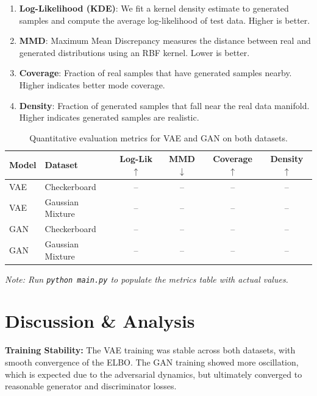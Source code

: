\documentclass[11pt]{article}
\begin{document}
\begin{enumerate}
    \item \textbf{Log-Likelihood (KDE)}: We fit a kernel density estimate to generated samples and compute the average log-likelihood of test data. Higher is better.
    \item \textbf{MMD}: Maximum Mean Discrepancy measures the distance between real and generated distributions using an RBF kernel. Lower is better.
    \item \textbf{Coverage}: Fraction of real samples that have generated samples nearby. Higher indicates better mode coverage.
    \item \textbf{Density}: Fraction of generated samples that fall near the real data manifold. Higher indicates generated samples are realistic.
\end{enumerate}

\begin{table}[H]
\centering
\caption{Quantitative evaluation metrics for VAE and GAN on both datasets.}
\label{tab:results}
\begin{tabular}{llcccc}
\toprule
\textbf{Model} & \textbf{Dataset} & \textbf{Log-Lik} $\uparrow$ & \textbf{MMD} $\downarrow$ & \textbf{Coverage} $\uparrow$ & \textbf{Density} $\uparrow$ \\
\midrule
VAE & Checkerboard & -- & -- & -- & -- \\
VAE & Gaussian Mixture & -- & -- & -- & -- \\
GAN & Checkerboard & -- & -- & -- & -- \\
GAN & Gaussian Mixture & -- & -- & -- & -- \\
\bottomrule
\end{tabular}
\end{table}

\textit{Note: Run \texttt{python main.py} to populate the metrics table with actual values.}

\section{Discussion \& Analysis}

\textbf{Training Stability:} The VAE training was stable across both datasets, with smooth convergence of the ELBO. The GAN training showed more oscillation, which is expected due to the adversarial dynamics, but ultimately converged to reasonable generator and discriminator losses.
\end{document}
